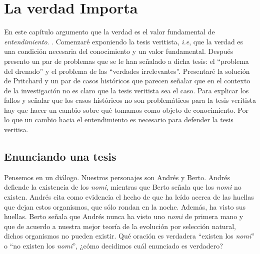 \documentclass{article}
\begin{document}
\listoftodos

\chapter{La verdad Importa}

\noindent En este capítulo argumento que la verdad es el valor fundamental de \textit{entendimiento}. . Comenzaré exponiendo la tesis veritista, \textit{i.e}, que la verdad es una condición necesaria del conocimiento y un valor fundamental. Después presento un par de problemas que se le han señalado a dicha tesis: el ``problema del drenado'' y el problema de las ``verdades irrelevantes''. Presentaré la solución de Pritchard y un par de casos históricos que parecen señalar que en el contexto de la investigación no es claro que la tesis veritista sea el caso. Para explicar los fallos y señalar que los casos históricos no son problemáticos para la tesis veritista hay que hacer un cambio sobre qué tomamos como objeto de conocimiento. Por lo que un cambio hacia el entendimiento es necesario para defender la tesis veritisa.

\section{Enunciando una tesis} \label{enunc}

\noindent {} Pensemos en un diálogo. Nuestros personajes son Andrés y Berto. Andrés defiende la existencia de los \textit{nomi}, mientras que Berto señala que los \textit{nomi} no existen. Andrés cita como evidencia el hecho de que ha leído acerca de las huellas que dejan estos organismos, que sólo rondan en la noche. Además, ha visto sus huellas. Berto señala que Andrés nunca ha visto uno \textit{nomi} de primera mano y que de acuerdo a nuestra mejor teoría de la evolución por selección natural, dichos organismos no pueden existir. Qué oración es verdadera ``existen los \textit{nomi}'' o ``no existen los \textit{nomi}'', ¿cómo decidimos cuál enunciado es verdadero?
\end{document}
